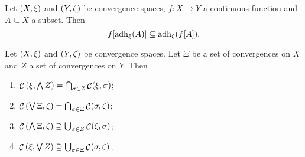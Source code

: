 \begin{proposition}
Let $\left( X,\xi \right)$ and $\left( Y,\zeta \right)$ be convergence spaces, $f: X\to Y$ a continuous function and $A\subseteq X$ a subset. Then
\[ f[\operatorname{adh}_\xi(A)] \subseteq \operatorname{adh}_\zeta(f[A]). \]
\end{proposition}

\begin{proposition} \label{continuityUnderConvergenceLatticeOperations}
Let $\left( X,\xi \right)$ and $\left( Y,\zeta \right)$ be convergence spaces. Let $\Xi$ be a set of convergences on $X$ and $Z$ a set of convergences on $Y$. Then
\begin{enumerate}
\item $\mathop{\mathcal{C}}\left(\xi, \bigwedge Z\right) = \bigcap_{\sigma\in Z} \mathop{\mathcal{C}}(\xi, \sigma)$;
\item $\mathop{\mathcal{C}}\left(\bigvee \Xi, \zeta\right) = \bigcap_{\sigma\in \Xi} \mathop{\mathcal{C}}(\sigma, \zeta)$;
\item $\mathop{\mathcal{C}}\left(\bigwedge \Xi, \zeta\right) \supseteq \bigcup_{\sigma\in Z} \mathop{\mathcal{C}}(\xi, \sigma)$;
\item $\mathop{\mathcal{C}}\left(\xi, \bigvee Z\right) \supseteq \bigcup_{\sigma\in \Xi} \mathop{\mathcal{C}}(\sigma, \zeta)$;
\end{enumerate}
\end{proposition}
